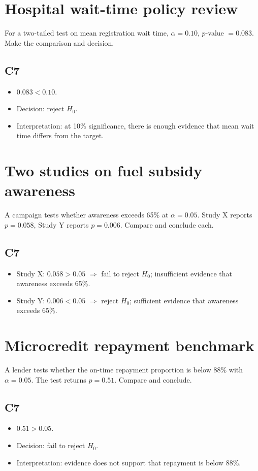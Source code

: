 \begin{ExamProblems}
\item
\section{Hospital wait-time policy review}
For a two-tailed test on mean registration wait time, \(\alpha=0.10\), \(p\)-value \(=0.083\). Make the comparison and decision.

\subsection*{C7}
\begin{itemize}
    \item \(0.083<0.10\).
    \item Decision: reject \(H_0\).
    \item Interpretation: at 10\% significance, there is enough evidence that mean wait time differs from the target.
\end{itemize}

\item
\section{Two studies on fuel subsidy awareness}
A campaign tests whether awareness exceeds 65\% at \(\alpha=0.05\). Study X reports \(p=0.058\), Study Y reports \(p=0.006\). Compare and conclude each.

\subsection*{C7}
\begin{itemize}
    \item Study X: \(0.058>0.05\) \(\Rightarrow\) fail to reject \(H_0\); insufficient evidence that awareness exceeds 65\%.
    \item Study Y: \(0.006<0.05\) \(\Rightarrow\) reject \(H_0\); sufficient evidence that awareness exceeds 65\%.
\end{itemize}

\item
\section{Microcredit repayment benchmark}
A lender tests whether the on-time repayment proportion is below 88\% with \(\alpha=0.05\). The test returns \(p=0.51\). Compare and conclude.

\subsection*{C7}
\begin{itemize}
    \item \(0.51>0.05\).
    \item Decision: fail to reject \(H_0\).
    \item Interpretation: evidence does not support that repayment is below 88\%.
\end{itemize}


\end{ExamProblems}
